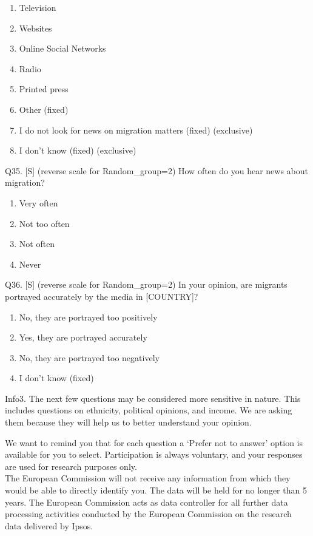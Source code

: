 \documentclass[
  12pt,
  a4paper,
]{article}
\providecommand{\tightlist}{%
  \setlength{\itemsep}{0pt}\setlength{\parskip}{0pt}}
\begin{document}
\begin{enumerate}
\def\labelenumi{\arabic{enumi}.}
\tightlist
\item
  Television
\item
  Websites
\item
  Online Social Networks
\item
  Radio
\item
  Printed press
\item
  Other (fixed)
\item
  I do not look for news on migration matters (fixed) (exclusive) \\
\item
  I don't know (fixed) (exclusive)
\end{enumerate}

Q35. {[}S{]} (reverse scale for Random\_group=2) How often do you hear news about migration?

\begin{enumerate}
\def\labelenumi{\arabic{enumi}.}
\tightlist
\item
  Very often\\
\item
  Not too often\\
\item
  Not often\\
\item
  Never
\end{enumerate}

Q36. {[}S{]} (reverse scale for Random\_group=2) In your opinion, are migrants portrayed accurately by the media in {[}COUNTRY{]}?

\begin{enumerate}
\def\labelenumi{\arabic{enumi}.}
\tightlist
\item
  No, they are portrayed too positively
\item
  Yes, they are portrayed accurately
\item
  No, they are portrayed too negatively
\item
  I don't know (fixed)
\end{enumerate}

Info3. The next few questions may be considered more sensitive in nature. This includes questions on ethnicity, political opinions, and income. We are asking them because they will help us to better understand your opinion.

We want to remind you that for each question a `Prefer not to answer' option is available for you to select. Participation is always voluntary, and your responses are used for research purposes only.\\
The European Commission will not receive any information from which they would be able to directly identify you. The data will be held for no longer than 5 years. The European Commission acts as data controller for all further data processing activities conducted by the European Commission on the research data delivered by Ipsos.
\end{document}
